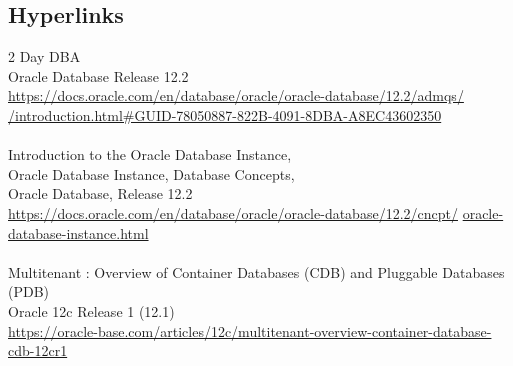 
\subsection{Hyperlinks}

2 Day DBA\\
Oracle Database Release 12.2\\
\href{https://docs.oracle.com/en/database/oracle/oracle-database/12.2/admqs/introduction.html#GUID-78050887-822B-4091-8DBA-A8EC43602350}{https://docs.oracle.com/en/database/oracle/oracle-database/12.2/admqs/}\\
\href{https://docs.oracle.com/en/database/oracle/oracle-database/12.2/admqs/introduction.html#GUID-78050887-822B-4091-8DBA-A8EC43602350}{/introduction.html\#GUID-78050887-822B-4091-8DBA-A8EC43602350}\\
\\
Introduction to the Oracle Database Instance,\\ 
Oracle Database Instance, Database Concepts,\\
Oracle Database, Release 12.2\\
\href{https://docs.oracle.com/en/database/oracle/oracle-database/12.2/cncpt/oracle-database-instance.html}{https://docs.oracle.com/en/database/oracle/oracle-database/12.2/cncpt/}\newline
\href{http://www.google.com}{oracle-database-instance.html}\\
\\
Multitenant : Overview of Container Databases (CDB) and Pluggable Databases (PDB)\\
Oracle 12c Release 1 (12.1)\\
\href{https://oracle-base.com/articles/12c/multitenant-overview-container-database-cdb-12cr1}{https://oracle-base.com/articles/12c/multitenant-overview-container-database-cdb-12cr1}
